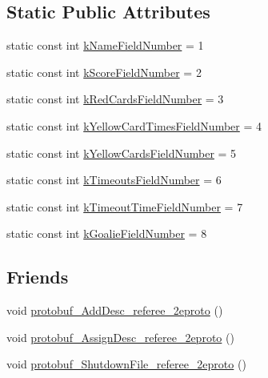 \subsection*{Static Public Attributes}
\begin{DoxyCompactItemize}
\item 
static const int \hyperlink{class_s_s_l___referee___team_info_af5f746c7741160975459f1c222ac73ea}{k\-Name\-Field\-Number} = 1
\item 
static const int \hyperlink{class_s_s_l___referee___team_info_a9b3a18375c39a924a50a1073bf5e0def}{k\-Score\-Field\-Number} = 2
\item 
static const int \hyperlink{class_s_s_l___referee___team_info_a2a79ab53e4b5ecd8b117dfab88565985}{k\-Red\-Cards\-Field\-Number} = 3
\item 
static const int \hyperlink{class_s_s_l___referee___team_info_a18a4fe3328abaeea6672cddccbed1fe4}{k\-Yellow\-Card\-Times\-Field\-Number} = 4
\item 
static const int \hyperlink{class_s_s_l___referee___team_info_a388cea14c50e9f8101b9203875f24f60}{k\-Yellow\-Cards\-Field\-Number} = 5
\item 
static const int \hyperlink{class_s_s_l___referee___team_info_a451783f47a125bb14849a885a3602d9f}{k\-Timeouts\-Field\-Number} = 6
\item 
static const int \hyperlink{class_s_s_l___referee___team_info_a84754863e083ab5a7a2680277b223f31}{k\-Timeout\-Time\-Field\-Number} = 7
\item 
static const int \hyperlink{class_s_s_l___referee___team_info_a698de25a80ba1defb042d5fedc30c05f}{k\-Goalie\-Field\-Number} = 8
\end{DoxyCompactItemize}
\subsection*{Friends}
\begin{DoxyCompactItemize}
\item 
void \hyperlink{class_s_s_l___referee___team_info_ac6da2c479aea3c420dd2227d81752594}{protobuf\-\_\-\-Add\-Desc\-\_\-referee\-\_\-2eproto} ()
\item 
void \hyperlink{class_s_s_l___referee___team_info_a0625f3a9e112e1c97492fb70ed4b2528}{protobuf\-\_\-\-Assign\-Desc\-\_\-referee\-\_\-2eproto} ()
\item 
void \hyperlink{class_s_s_l___referee___team_info_a829b15253788b95c3a0ff8c4358647d0}{protobuf\-\_\-\-Shutdown\-File\-\_\-referee\-\_\-2eproto} ()
\end{DoxyCompactItemize}


